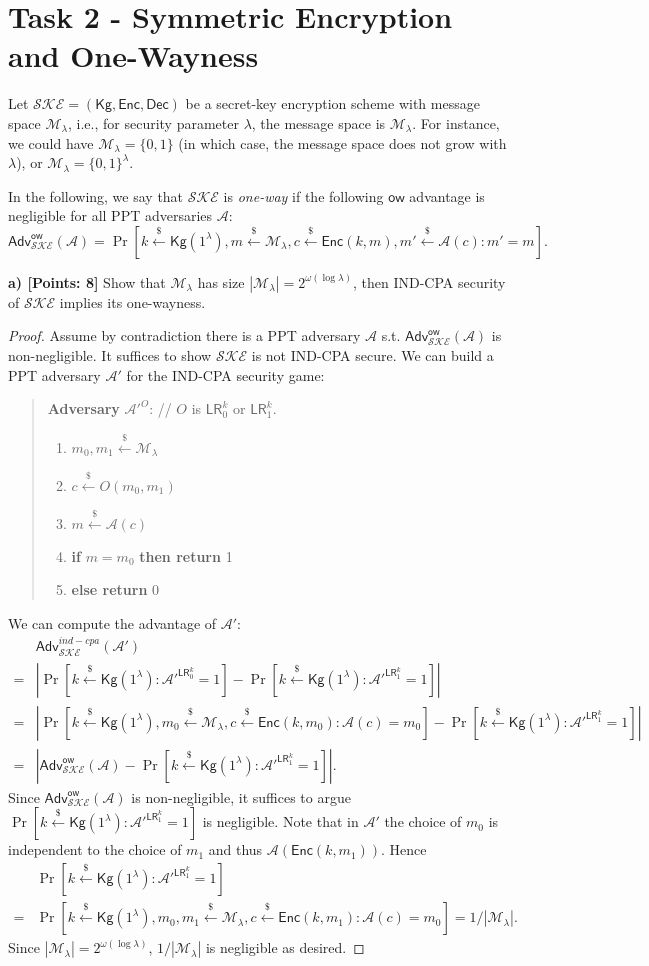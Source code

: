 \documentclass[12pt]{article}
\newcommand{\bits}{\{0,1\}}
\newcommand{\getsr}{\stackrel{\$}{\gets}}
\newcommand{\Adv}{\textsf{Adv}}
\newcommand{\M}{\mathcal{M}}
\theoremstyle{definition}
\newcommand{\Kg}{\textsf{Kg}}
\newcommand{\Enc}{\textsf{Enc}}
\newcommand{\Dec}{\textsf{Dec}}
\newcommand{\A}{\mathcal{A}}
\newcommand{\LR}{\textsf{LR}}
\begin{document}
\section{Task 2 - Symmetric Encryption and One-Wayness}
\newcommand{\SKE}{\mathcal{SKE}}
\newcommand{\ow}{\mathsf{ow}}
Let $\SKE = (\Kg, \Enc, \Dec)$ be a secret-key encryption scheme with message space $\M_{\lambda}$, i.e., for security parameter $\lambda$, the message space is $\M_{\lambda}$. For instance, we could have $\M_{\lambda} = \bits$ (in which case, the message space does not grow with $\lambda$), or $\M_{\lambda} = \bits^\lambda$.

In the following, we say that $\SKE$ is \emph{one-way} if the following $\ow$ advantage is negligible for all PPT adversaries $\A$:
$$\Adv_{\SKE}^{\ow}(\A) = \Pr[k \getsr \Kg(1^\lambda), m \getsr \M_{\lambda}, c\getsr \Enc(k,m), m' \getsr \A(c): m'=m].$$

{\bf a) [Points: 8]} Show that $\M_{\lambda}$ has size $|\M_{\lambda}| = 2^{\omega(\log \lambda)}$, then IND-CPA security of $\SKE$ implies its one-wayness.
\begin{proof}
Assume by contradiction there is a PPT adversary $\A$ s.t. $\Adv_{\SKE}^{\ow}(\A)$ is non-negligible. It suffices to show $\SKE$ is not IND-CPA secure. We can build a PPT adversary $\A'$ for the IND-CPA security game:
\begin{quote}
{\bf Adversary} $\A'^O$: // $O$ is $\LR_0^k$ or $\LR_1^k$.
\begin{enumerate}
\item $m_0, m_1 \getsr \M_{\lambda}$
\item $c \getsr O(m_0,m_1)$
\item $m \getsr \A(c)$
\item {\bf if} $m=m_0$ {\bf then return} 1
\item {\bf else return} 0
\end{enumerate}
\end{quote}
We can compute the advantage of $\A'$:
$$\begin{aligned}
&\Adv_{\SKE}^{ind-cpa}(\A') \\
=& |\Pr[k \getsr \Kg(1^\lambda): \A'^{\LR_0^k}=1] - \Pr[k \getsr \Kg(1^\lambda): \A'^{\LR_1^k}=1]| \\
=& |\Pr[k \getsr \Kg(1^\lambda), m_0 \getsr \M_{\lambda}, c \getsr \Enc(k, m_0): \A(c)=m_0] - \Pr[k \getsr \Kg(1^\lambda): \A'^{\LR_1^k}=1]| \\
=& |\Adv_{\SKE}^{\ow}(\A) - \Pr[k \getsr \Kg(1^\lambda): \A'^{\LR_1^k}=1]|.
\end{aligned}$$
Since $\Adv_{\SKE}^{\ow}(\A)$ is non-negligible, it suffices to argue $\Pr[k \getsr \Kg(1^\lambda): \A'^{\LR_1^k}=1]$ is negligible. Note that in $\A'$ the choice of $m_0$ is independent to the choice of $m_1$ and thus $\A(\Enc(k,m_1))$. Hence
$$\begin{aligned}
&\Pr[k \getsr \Kg(1^\lambda): \A'^{\LR_1^k}=1] \\
=& \Pr[k \getsr \Kg(1^\lambda), m_0,m_1 \getsr \M_{\lambda}, c \getsr \Enc(k, m_1): \A(c)=m_0] 
= 1/|\M_{\lambda}|.
\end{aligned}$$
Since $|\M_{\lambda}| = 2^{\omega(\log \lambda)}$, $1/|\M_{\lambda}|$ is negligible as desired.
\end{proof}
\end{document}
